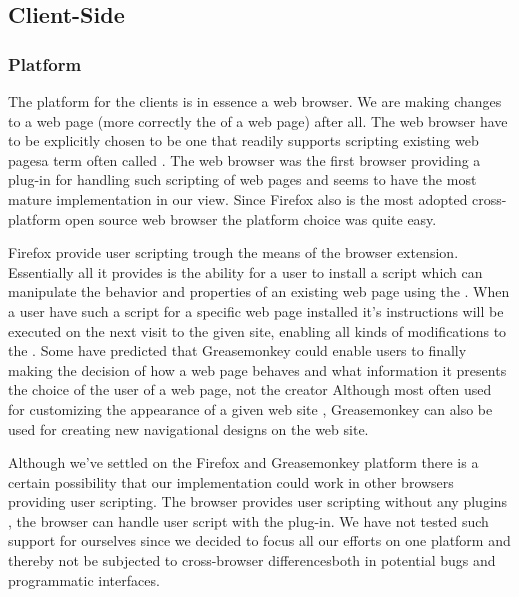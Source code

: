 \subsection{Client-Side}

\subsubsection{Platform}
\label{section:selection.stack.client.platform}

The platform for the clients is in essence a web browser. We are making
changes to a web page (more correctly the  of a web page)
after all. The web browser have to be explicitly chosen
to be one that readily supports scripting existing
web pages\dash{}a term often called .
The %
web browser was the first browser providing a
plug-in for handling such scripting of web pages and seems to have the most
mature implementation in our view. Since Firefox also is the
most adopted%
cross-platform open source web browser the platform choice was quite easy.

Firefox provide user scripting trough the means of the
%
browser extension. Essentially all it provides is the ability for a user to
install a script which can manipulate the behavior and properties of an
existing web page using the %
.
When a user have such a script for a specific web page installed it's
instructions will be executed on the next visit to the given site, enabling
all kinds of modifications to the .
Some have predicted that Greasemonkey could enable users to
finally \dash{}making the decision of how a web page
behaves and what information it presents the choice of the user of a web page,
not the creator \citep[pp.~3--4.]{filman06}
Although most often used
for customizing the appearance of a given web site \citep[p.~39]{vitali06},
Greasemonkey can also be used for creating new navigational designs on the
\urort{} web site.

Although we've settled on the Firefox and Greasemonkey platform there is a
certain possibility that our implementation could work in other browsers
providing user scripting. The  browser provides user scripting
without any plugins%
,
the  browser can handle user script with the
%
plug-in. We have not tested such support for ourselves since we decided to
focus all our efforts on one platform and thereby not be subjected to
cross-browser differences\dash{}both in potential bugs and programmatic
interfaces.

